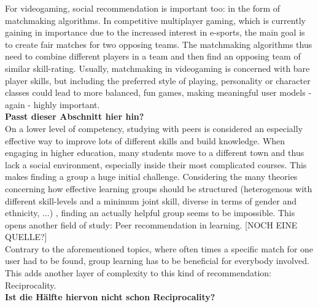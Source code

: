 \documentclass[nochapterpage,bigchapter,linedtoc,longdoc,colorback,accentcolor=tud3b,oneside]{tudreport}
\begin{document}
For videogaming, social recommendation is important too: in the form of matchmaking algorithms. In competitive multiplayer gaming, which is currently gaining in importance due to the increased interest in e-sports, the main goal is to create fair matches for two opposing teams. The matchmaking algorithms thus need to combine different players in a team and then find an opposing team of similar skill-rating. Usually, matchmaking in videogaming is concerned with bare player skills, but including the preferred style of playing, personality or character classes could lead to more balanced, fun games, making meaningful user models - again - highly important.\\
\textbf{Passt dieser Abschnitt hier hin?}\\
On a lower level of competency, studying with peers is considered an especially effective way to improve lots of different skills and build knowledge. \cite{maxwell2008learning} When engaging in higher education, many students move to a different town and thus lack a social environment, especially inside their most complicated courses. This makes finding a group a huge initial challenge. Considering the many theories concerning how effective learning groups should be structured (heterogenous with different skill-levels and a minimum joint skill, diverse in terms of gender and ethnicity, ...) \cite{manske2015using, blumenfeld1996learning}, finding an actually helpful group seems to be impossible. This opens another field of study: Peer recommendation in learning. \cite{potts2018reciprocal, olakanmi2017group} [NOCH EINE QUELLE?]\\
Contrary to the aforementioned topics, where often times a specific match for one user had to be found, group learning has to be beneficial for everybody involved. This adds another layer of complexity to this kind of recommendation: Reciprocality.\\
\textbf{Ist die Hälfte hiervon nicht schon Reciprocality?}
\end{document}

